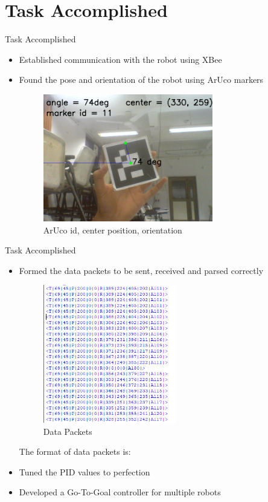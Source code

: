 \documentclass[10pt,a4paper]{beamer}
\begin{document}
\section{Task Accomplished}
\begin{frame}{Task Accomplished}
\begin{itemize}
\item Established communication with the robot using XBee\pause
\item Found the pose and orientation of the robot using ArUco markers\pause
\begin{figure}
\includegraphics[height=0.6\textheight, width=0.7\textwidth]{image_screenshot2.png}\caption{ArUco id, center position, orientation}
\end{figure}
\end{itemize}
\end{frame}

\begin{frame}{Task Accomplished}
\begin{itemize}
\item Formed the data packets to be sent, received and parsed correctly\pause
\begin{figure}
\includegraphics[height=0.45\textheight, width=0.55\textwidth]{capture.png}\caption{Data Packets}
\end{figure}
The format of data packets is:
\small{}\pause
\item Tuned the PID values to perfection\pause
\item Developed a Go-To-Goal controller for multiple robots
\end{itemize}
\end{frame}
\end{document}
